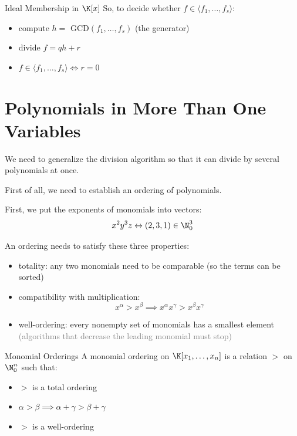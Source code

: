 \documentclass[a4paper, 11pt]{report}
\begin{document}
\begin{thmframe}{Ideal Membership in $\K[x]$}{}
    So, to decide whether $f \in \langle f_{1}, \dots , f_{s} \rangle$:
\begin{itemize}
    \item compute $h =$ GCD$(f_1, \dots, f_{s})$ (the generator)
    \item divide $f = qh+r$
    \item $f \in\langle f_{1}, \dots , f_{s} \rangle \iff r=0$
\end{itemize}
\end{thmframe}

\section{Polynomials in More Than One Variables}
We need to generalize the division algorithm so that it can divide by several polynomials at once.

First of all, we need to establish an ordering of polynomials.

First, we put the exponents of monomials into vectors:
$$ x^{2}y^{3}z \leftrightarrow (2,3,1) \in \N^{3}_{0}$$

An ordering needs to satisfy these three properties:
\begin{itemize}
    \item totality: any two monomials need to be comparable (so the terms can be sorted)
    \item compatibility with multiplication:
        $$ x^{\alpha} > x^{\beta} \implies x^{\alpha}x^{\gamma} > x^{\beta}x^{\gamma} $$
    \item well-ordering: every nonempty set of monomials has a smallest element \textcolor{gray}{(algorithms that decrease the leading monomial must stop)}
\end{itemize}

\begin{defframe}{Monomial Orderings}{}
    A monomial ordering on $\K[x_{1}, \dots, x_{n}]$ is a relation $>$ on $\N_{0}^{n}$ such that:
    \begin{itemize}
        \item $>$ is a total ordering
        \item $\alpha > \beta \implies \alpha + \gamma > \beta + \gamma$
        \item $>$ is a well-ordering
    \end{itemize}
\end{defframe}
\end{document}

